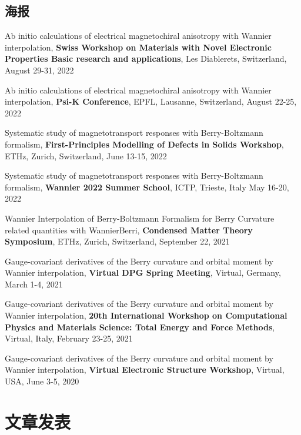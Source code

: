 \documentclass[11pt,a4paper,sans]{moderncv} %
\begin{document}
\subsection{海报}
\begin{etaremune}
  \item Ab initio calculations of electrical magnetochiral anisotropy with Wannier interpolation, \textbf{Swiss Workshop on Materials with Novel Electronic Properties Basic research and applications}, Les Diablerets, Switzerland, August 29-31, 2022
  \item Ab initio calculations of electrical magnetochiral anisotropy with Wannier interpolation, \textbf{Psi-K Conference}, EPFL, Lausanne, Switzerland, August 22-25, 2022
  \item Systematic study of magnetotransport responses with Berry-Boltzmann formalism, \textbf{First-Principles Modelling of Defects in Solids Workshop}, ETHz, Zurich, Switzerland, June 13-15, 2022
  \item Systematic study of magnetotransport responses with Berry-Boltzmann formalism, \textbf{Wannier 2022 Summer School}, ICTP, Trieste, Italy May 16-20, 2022
  \item Wannier Interpolation of Berry-Boltzmann Formalism for Berry Curvature related quantities with WannierBerri, \textbf{Condensed Matter Theory Symposium}, ETHz, Zurich, Switzerland, September 22, 2021
  \item Gauge-covariant derivatives of the Berry curvature and orbital moment by Wannier interpolation, \textbf{Virtual DPG Spring Meeting}, Virtual, Germany, March 1-4, 2021
  \item Gauge-covariant derivatives of the Berry curvature and orbital moment by Wannier interpolation, \textbf{20th International Workshop on Computational Physics and Materials Science: Total Energy and Force Methods}, Virtual, Italy, February 23-25, 2021
  \item Gauge-covariant derivatives of the Berry curvature and orbital moment by Wannier interpolation, \textbf{Virtual Electronic Structure Workshop}, Virtual, USA, June 3-5, 2020
\end{etaremune}


\section{文章发表}
\end{document}
